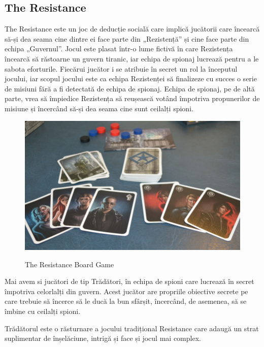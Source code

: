 \newpage
\subsection{The Resistance}

The Resistance este un joc de deducție socială care implică jucătorii care încearcă să-și dea seama cine dintre ei face parte din „Rezistență” și cine face parte din echipa „Guvernul”. Jocul este plasat într-o lume fictivă în care Rezistența încearcă să răstoarne un guvern tiranic, iar echipa de spionaj lucrează pentru a le sabota eforturile.
\newline
\newline
Fiecărui jucător i se atribuie în secret un rol la începutul jocului, iar scopul jocului este ca echipa Rezistenței să finalizeze cu succes o serie de misiuni fără a fi detectată de echipa de spionaj. Echipa de spionaj, pe de altă parte, vrea să împiedice Rezistența să reușească votând împotriva propunerilor de misiune și încercând să-și dea seama cine sunt ceilalți spioni.
\newline
\newline

\newline

\begin{figure}[h]
    \centering
    \includegraphics[width=16cm]{text/images/pic2.jpg}\\
    \caption{The Resistance Board Game}
\end{figure} \newline
\newline

\newline


\newline

\newline
Mai avem si jucători de tip Trădători, în echipa de spioni care lucrează în secret împotriva celorlalți din guvern. Acest jucător are propriile obiective secrete pe care trebuie să încerce să le ducă la bun sfârșit, încercând, de asemenea, să se îmbine cu ceilalți spioni.

Trădătorul este o răsturnare a jocului tradițional Resistance care adaugă un strat suplimentar de înșelăciune, intrigă și face și jocul mai complex.


